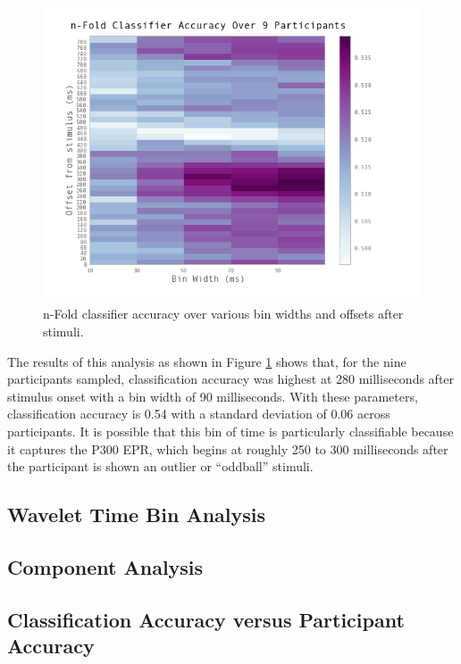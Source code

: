 \documentclass[11pt]{report}
\begin{document}
\begin{figure}[t]
\centering
\includegraphics[width=5.5in]{gridsearch_logreg_simple}
\caption{n-Fold classifier accuracy over various bin widths and offsets after stimuli.\label{nfoldsimple}}
\end{figure}

The results of this analysis as shown in Figure \ref{nfoldsimple} shows that, for the nine participants sampled, classification accuracy was highest at 280 milliseconds after stimulus onset with a bin width of 90 milliseconds.  With these parameters, classification accuracy is 0.54 with a standard deviation of 0.06 across participants.  It is possible that this bin of time is particularly classifiable because it captures the P300 EPR, which begins at roughly 250 to 300 milliseconds after the participant is shown an outlier or ``oddball'' stimuli. 

\subsection{Wavelet Time Bin Analysis}

\subsection{Component Analysis}

\subsection{Classification Accuracy versus Participant Accuracy}
\end{document}
